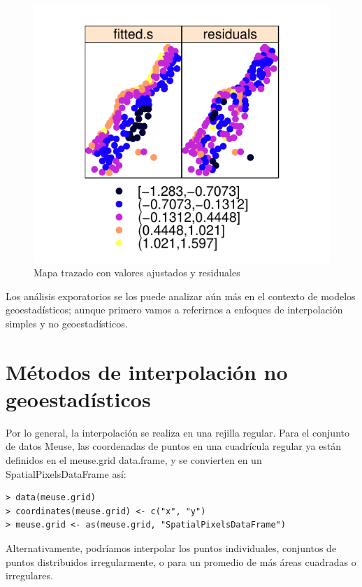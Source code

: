 \begin{figure}
  \centering
  \includegraphics[scale=1]{pictures/figura01.pdf}
  \caption{Mapa trazado con valores ajustados y residuales}
  \label{fig:figura01}
\end{figure}

Los análisis exporatorios se los puede analizar aún más en el contexto de modelos geoestadísticos; aunque primero 
vamos a referirnos a enfoques de interpolación simples y no geoestadísticos.

\section{Métodos de interpolación no geoestadísticos}

Por lo general, la interpolación se realiza en una rejilla regular. Para el conjunto de datos Meuse,
las coordenadas de puntos en una cuadrícula regular ya están definidos en el meuse.grid
data.frame, y se convierten en un SpatialPixelsDataFrame así:
\\
\begin{lstlisting}
> data(meuse.grid)
> coordinates(meuse.grid) <- c("x", "y")
> meuse.grid <- as(meuse.grid, "SpatialPixelsDataFrame")
\end{lstlisting}

Alternativamente, podríamos interpolar los puntos individuales, conjuntos de puntos distribuidos irregularmente, 
o para un promedio de más áreas cuadradas o irregulares.

